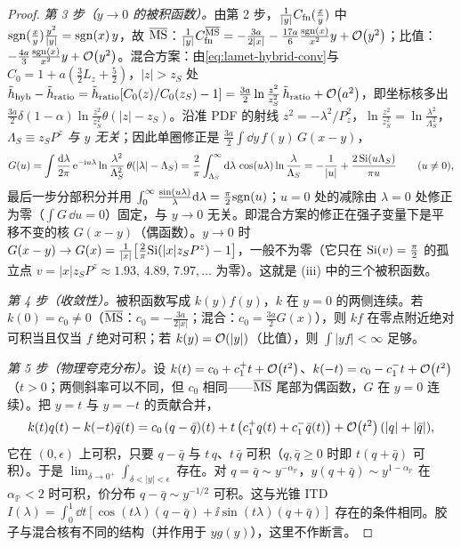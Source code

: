 \begin{proof}
\emph{第 3 步（$y\to0$ 的被积函数）。}由第 2 步，$\frac1{|y|}C_{\rm fn}(\frac xy)$ 中 ${\rm sgn}(\frac xy)\frac{y^2}{|y|}={\rm sgn}(x)\,y$，故 $\overline{\mathrm{MS}}$：$\frac1{|y|}C^{\overline{\mathrm{MS}}}_{\rm fn}=-\frac{3a}{2|x|}-\frac{17a}6\frac{{\rm sgn}(x)}{x^2}y+\mathcal{O}\!\left(y^2\right)$；比值：$-\frac{4a}3\frac{{\rm sgn}(x)}{x^2}y+\mathcal{O}\!\left(y^2\right)$。混合方案：由\cref{eq:lamet-hybrid-conv}与 $C_0=1+a(\frac32L_z+\frac52)$，$|z|>z_S$ 处 $\tilde h_{\rm hyb}-\tilde h_{\rm ratio}=\tilde h_{\rm ratio}[C_0(z)/C_0(z_S)-1]=\frac{3a}2\ln\frac{z^2}{z_S^2}\,\tilde h_{\rm ratio}+\mathcal{O}\!\left(a^2\right)$，即坐标核多出 $\frac{3a}2\delta(1-\alpha)\ln\frac{z^2}{z_S^2}\theta(|z|-z_S)$。沿准 PDF 的射线 $z^2=-\lambda^2/P_z^2$，$\ln\frac{z^2}{z_S^2}=\ln\frac{\lambda^2}{\Lambda_S^2}$，$\Lambda_S\equiv z_SP^z$ \emph{与 $y$ 无关}；因此单圈修正是 $\frac{3a}2\int\dd y\,f(y)\,G(x-y)$，
\[
G(u)=\int\frac{\mathrm{d}\lambda}{2\pi}\,\mathrm{e}^{-\mathrm{i} u\lambda}\ln\frac{\lambda^2}{\Lambda_S^2}\,\theta(|\lambda|-\Lambda_S)=\frac2\pi\int_{\Lambda_S}^\infty\mathrm{d}\lambda\,\cos(u\lambda)\ln\frac\lambda{\Lambda_S}=-\frac1{|u|}+\frac{2\,{\rm Si}(u\Lambda_S)}{\pi u}\qquad(u\neq0),
\]
最后一步分部积分并用 $\int_0^\infty\frac{\sin(u\lambda)}\lambda\mathrm{d}\lambda=\frac\pi2{\rm sgn}(u)$；$u=0$ 处的减除由 $\lambda=0$ 处修正为零（$\int G\,\dd u=0$）固定，与 $y\to0$ 无关。即混合方案的修正在强子变量下是平移不变的核 $G(x-y)$（偶函数）。$y\to0$ 时 $G(x-y)\to G(x)=\frac1{|x|}\big[\frac2\pi{\rm Si}(|x|z_SP^z)-1\big]$，一般不为零（它只在 ${\rm Si}(v)=\frac\pi2$ 的孤立点 $v=|x|z_SP^z\approx1.93,\,4.89,\,7.97,\dots$ 为零）。这就是 (iii) 中的三个被积函数。

\emph{第 4 步（收敛性）。}被积函数写成 $k(y)f(y)$，$k$ 在 $y=0$ 的两侧连续。若 $k(0)=c_0\neq0$（$\overline{\mathrm{MS}}$：$c_0=-\frac{3a}{2|x|}$；混合：$c_0=\frac{3a}2G(x)$），则 $kf$ 在零点附近绝对可积当且仅当 $f$ 绝对可积；若 $k(y)=\mathcal{O}\!\left(|y|\right)$（比值），则 $\int|yf|<\infty$ 足够。

\emph{第 5 步（物理夸克分布）。}设 $k(t)=c_0+c_1^+t+\mathcal{O}\!\left(t^2\right)$、$k(-t)=c_0-c_1^-t+\mathcal{O}\!\left(t^2\right)$（$t>0$；两侧斜率可以不同，但 $c_0$ 相同——$\overline{\mathrm{MS}}$ 尾部为偶函数，$G$ 在 $y=0$ 连续）。把 $y=t$ 与 $y=-t$ 的贡献合并，
\[
k(t)q(t)-k(-t)\bar q(t)=c_0\,(q-\bar q)(t)+t\,\big(c_1^+q(t)+c_1^-\bar q(t)\big)+\mathcal{O}\!\left(t^2\right)(|q|+|\bar q|),
\]
它在 $(0,\epsilon)$ 上可积，只要 $q-\bar q$ 与 $t\,q$、$t\,\bar q$ 可积（$q,\bar q\ge0$ 时即 $t(q+\bar q)$ 可积）。于是 $\lim_{\delta\to0^+}\int_{\delta<|y|<\epsilon}$ 存在。对 $q=\bar q\sim y^{-\alpha_{\mathbb P}}$，$y(q+\bar q)\sim y^{1-\alpha_{\mathbb P}}$ 在 $\alpha_{\mathbb P}<2$ 时可积，价分布 $q-\bar q\sim y^{-1/2}$ 可积。这与光锥 ITD $I(\lambda)=\int_0^1\dd t[\cos(t\lambda)(q-\bar q)+\ii\sin(t\lambda)(q+\bar q)]$ 存在的条件相同。胶子与混合核有不同的结构（并作用于 $yg(y)$），这里不作断言。


\end{proof}

